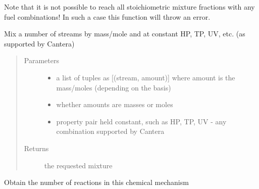 \documentclass[letterpaper,10pt,english]{sphinxmanual}
\begin{document}
\begin{fulllineitems}
\begin{fulllineitems}
Note that it is not possible to reach all stoichiometric mixture fractions with any fuel combinations!
In such a case this function will throw an error.

\end{fulllineitems}


\begin{fulllineitems}
\label{\detokenize{spitfire.chemistry.mechanism:spitfire.chemistry.mechanism.ChemicalMechanismSpec.mix_streams}}
Mix a number of streams by mass/mole and at constant HP, TP, UV, etc. (as supported by Cantera)
\begin{quote}\begin{description}
\item[{Parameters}] \leavevmode\begin{itemize}
\item {} 
 \textendash{} a list of tuples as {[}(stream, amount){]} where amount is the mass/moles (depending on the basis)

\item {} 
 \textendash{} whether amounts are masses or moles

\item {} 
 \textendash{} property pair held constant, such as HP, TP, UV - any combination supported by Cantera

\end{itemize}

\item[{Returns}] \leavevmode
the requested mixture

\end{description}\end{quote}

\end{fulllineitems}


\begin{fulllineitems}
\label{\detokenize{spitfire.chemistry.mechanism:spitfire.chemistry.mechanism.ChemicalMechanismSpec.n_reactions}}
Obtain the number of reactions in this chemical mechanism


\end{fulllineitems}
\end{fulllineitems}
\end{document}
